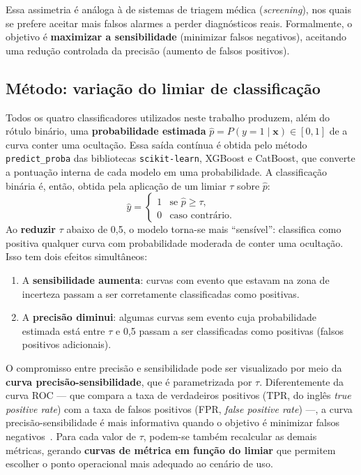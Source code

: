 Essa assimetria é análoga à de sistemas de triagem médica (\textit{screening}), nos quais se prefere aceitar mais falsos alarmes a perder diagnósticos reais. Formalmente, o objetivo é \textbf{maximizar a sensibilidade} (minimizar falsos negativos), aceitando uma redução controlada da precisão (aumento de falsos positivos).

\subsection{Método: variação do limiar de classificação}

Todos os quatro classificadores utilizados neste trabalho produzem, além do rótulo binário, uma \textbf{probabilidade estimada} $\hat{p} = P(y=1 \mid \mathbf{x}) \in [0,1]$ de a curva conter uma ocultação. Essa saída contínua é obtida pelo método \texttt{predict\_proba} das bibliotecas \texttt{scikit-learn}, XGBoost e CatBoost, que converte a pontuação interna de cada modelo em uma probabilidade. A classificação binária é, então, obtida pela aplicação de um limiar $\tau$ sobre $\hat{p}$:
%
\[
\hat{y} =
\begin{cases}
1 & \text{se } \hat{p} \geq \tau, \\
0 & \text{caso contrário.}
\end{cases}
\]
%
Ao \textbf{reduzir} $\tau$ abaixo de 0,5, o modelo torna-se mais ``sensível'': classifica como positiva qualquer curva com probabilidade moderada de conter uma ocultação. Isso tem dois efeitos simultâneos:

\begin{enumerate}
	\item A \textbf{sensibilidade aumenta}: curvas com evento que estavam na zona de incerteza passam a ser corretamente classificadas como positivas.
	\item A \textbf{precisão diminui}: algumas curvas sem evento cuja probabilidade estimada está entre $\tau$ e 0,5 passam a ser classificadas como positivas (falsos positivos adicionais).
\end{enumerate}

O compromisso entre precisão e sensibilidade pode ser visualizado por meio da \textbf{curva precisão-sensibilidade}, que é parametrizada por $\tau$. Diferentemente da curva ROC --- que compara a taxa de verdadeiros positivos (TPR, do inglês \textit{true positive rate}) com a taxa de falsos positivos (FPR, \textit{false positive rate}) ---, a curva precisão-sensibilidade é mais informativa quando o objetivo é minimizar falsos negativos~\citep{Saito2015}. Para cada valor de $\tau$, podem-se também recalcular as demais métricas, gerando \textbf{curvas de métrica em função do limiar} que permitem escolher o ponto operacional mais adequado ao cenário de uso.

